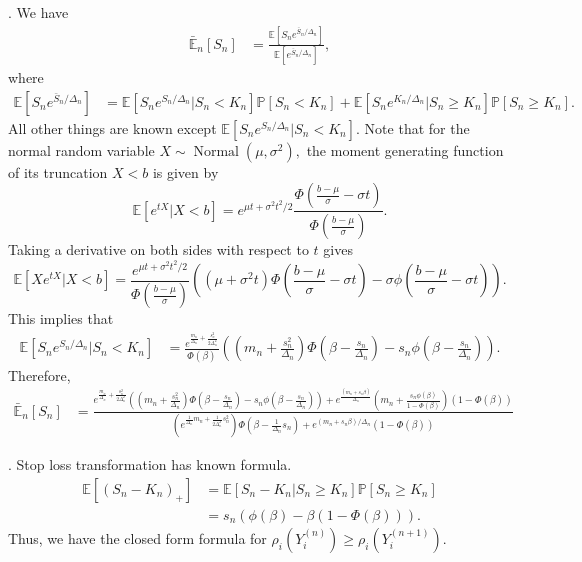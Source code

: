\documentclass[fleqn,mnsc,nonblindrev]{informs4}
\newcommand{\Normal}{\operatorname{Normal}}
\newcommand{\EE}{\mathbb{E}}
\begin{document}
. We have
\begin{align*}
\bar{\EE}_n[S_n]&=\frac{\EE[S_n e^{\bar{S}_n/\Delta_n}]}{\EE[e^{\bar{S}_n/\Delta_n}]},
\end{align*}
where
\begin{align*}
\EE[S_n e^{\bar{S}_n/\Delta_n}]&=\mathbb{E}\left[S_ne^{S_n/\Delta_n}|S_n<K_n\right]\mathbb{P}[S_n<K_n]+\mathbb{E}\left[S_ne^{K_n/\Delta_n}|S_n\geq K_n\right]\mathbb{P}[S_n\geq K_n].
\end{align*}
All other things are known except $\mathbb{E}\left[S_ne^{S_n/\Delta_n}|S_n<K_n\right].$ Note that for the normal random variable $X\sim \Normal(\mu,\sigma^2),$ the moment generating function of its truncation $X<b$ is given by
\[
\mathbb{E}\left[e^{tX}|X<b\right]=e^{\mu t+\sigma^2t^2/2}\frac{\Phi\left(\frac{b-\mu}{\sigma}-\sigma t\right)}{\Phi\left(\frac{b-\mu}{\sigma}\right)}.
\]
Taking a derivative on both sides with respect to $t$ gives
\[
\mathbb{E}\left[Xe^{tX}|X<b\right]=\frac{e^{\mu t+\sigma^2t^2/2}}{\Phi\left(\frac{b-\mu}{\sigma}\right)}\left((\mu +\sigma^2t)\Phi\left(\frac{b-\mu}{\sigma}-\sigma t\right)-\sigma \phi\left(\frac{b-\mu}{\sigma}-\sigma t\right)\right).
\]
This implies that
\begin{align*}
\mathbb{E}\left[S_ne^{S_n/\Delta_n}|S_n<K_n\right]&=\frac{e^{\frac{m_n}{\Delta_n}+\frac{s_n^2}{2\Delta_n^2}}}{\Phi\left(\beta\right)}\left(\left(m_n+\frac{s_n^2}{\Delta_n}\right)\Phi\left(\beta-\frac{s_n}{\Delta_n} \right)-s_n \phi\left(\beta-\frac{s_n}{\Delta_n}\right)\right).
\end{align*}
Therefore,
{\small
\begin{align*}
\bar{\EE}_n[S_n]&=\frac{e^{\frac{m_n}{\Delta_n}+\frac{s_n^2}{2\Delta_n^2}}\left(\left(m_n+\frac{s_n^2}{\Delta_n}\right)\Phi\left(\beta-\frac{s_n}{\Delta_n} \right)-s_n \phi\left(\beta-\frac{s_n}{\Delta_n}\right)\right)+e^{\frac{(m_n+s_n\beta)}{\Delta_n}}\left(m_n+\frac{s_n\phi(\beta)}{1-\Phi(\beta)}\right)(1-\Phi(\beta))}{\left(e^{\frac{1}{\Delta_{n}}m_n+\frac{1}{2\Delta_{n}^2}s_{n}^2}\right)\Phi\left(\beta-\frac{1}{\Delta_{n}}s_{n}\right)+e^{(m_n+s_n\beta)/\Delta_n}(1-\Phi(\beta))}
\end{align*}
}

.  Stop loss transformation has known formula.
\begin{align*}
\EE[(S_n-K_n)_+]&=\mathbb{E}\left[S_n-K_n|S_n\geq K_n\right]\mathbb{P}[S_n\geq K_n]\\
&=s_n\left(\phi(\beta)-\beta(1-\Phi(\beta))\right).
\end{align*}
Thus, we have the closed form formula for $
\rho_i(Y^{(n)}_i)\geq \rho_i(Y^{(n+1)}_i)$. 
\end{document}
